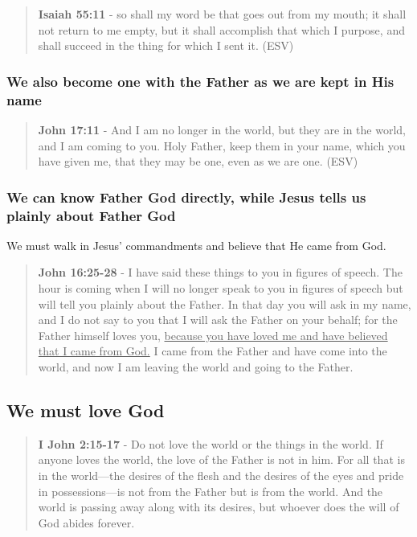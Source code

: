 \documentclass[11pt]{article}
\begin{document}
\begin{quote}
\textbf{Isaiah 55:11} - so shall my word be that goes out from my mouth; it shall not return to me empty, but it shall accomplish that which I purpose, and shall succeed in the thing for which I sent it. (ESV)
\end{quote}

\subsubsection{We also become one with the Father as we are kept in His name}
\label{sec:orgc4d11fd}

\begin{quote}
\textbf{John 17:11} - And I am no longer in the world, but they are in the world, and I am coming to you. Holy Father, keep them in your name, which you have given me, that they may be one, even as we are one. (ESV)
\end{quote}

\subsubsection{We can know Father God directly, while Jesus tells us plainly about Father God}
\label{sec:orgdc8842a}
We must walk in Jesus' commandments and believe that He came from God.

\begin{quote}
\textbf{John 16:25-28} - I have said these things to you in figures of speech. The hour is coming when I will no longer speak to you in figures of speech but will tell you plainly about the Father. In that day you will ask in my name, and I do not say to you that I will ask the Father on your behalf; for the Father himself loves you, \uline{because you have loved me and have believed that I came from God.} I came from the Father and have come into the world, and now I am leaving the world and going to the Father.
\end{quote}

\subsection{We must love God}
\label{sec:orgfcedf8a}
\begin{quote}
\textbf{I John 2:15-17} - Do not love the world or the things in the world. If anyone loves the world, the love of the Father is not in him. For all that is in the world—the desires of the flesh and the desires of the eyes and pride in possessions—is not from the Father but is from the world. And the world is passing away along with its desires, but whoever does the will of God abides forever.
\end{quote}
\end{document}

